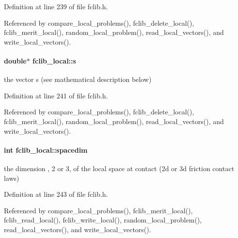 Definition at line 239 of file fclib.\+h.



Referenced by compare\+\_\+local\+\_\+problems(), fclib\+\_\+delete\+\_\+local(), fclib\+\_\+merit\+\_\+local(), random\+\_\+local\+\_\+problem(), read\+\_\+local\+\_\+vectors(), and write\+\_\+local\+\_\+vectors().

\hypertarget{structfclib__local_abb6b3a07d92a86aac1c38e4d847207e3}{}
\paragraph[{s}]{\setlength{\rightskip}{0pt plus 5cm}double$\ast$ fclib\+\_\+local\+::s}\label{structfclib__local_abb6b3a07d92a86aac1c38e4d847207e3}


the vector s (see mathematical description below) 



Definition at line 241 of file fclib.\+h.



Referenced by compare\+\_\+local\+\_\+problems(), fclib\+\_\+delete\+\_\+local(), fclib\+\_\+merit\+\_\+local(), random\+\_\+local\+\_\+problem(), read\+\_\+local\+\_\+vectors(), and write\+\_\+local\+\_\+vectors().

\hypertarget{structfclib__local_accf07018913652e57be3a661b25d8bb7}{}
\paragraph[{spacedim}]{\setlength{\rightskip}{0pt plus 5cm}int fclib\+\_\+local\+::spacedim}\label{structfclib__local_accf07018913652e57be3a661b25d8bb7}


the dimension , 2 or 3, of the local space at contact (2d or 3d friction contact laws) 



Definition at line 243 of file fclib.\+h.



Referenced by compare\+\_\+local\+\_\+problems(), fclib\+\_\+merit\+\_\+local(), fclib\+\_\+read\+\_\+local(), fclib\+\_\+write\+\_\+local(), random\+\_\+local\+\_\+problem(), read\+\_\+local\+\_\+vectors(), and write\+\_\+local\+\_\+vectors().

\hypertarget{structfclib__local_ababce9da71cdb99e4928a596dde8bc89}{}
